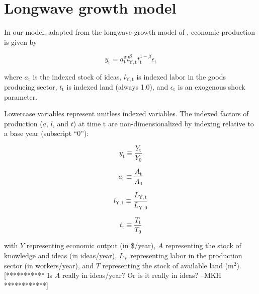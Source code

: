 \documentclass[letterpaper,12pt]{article}
\begin{document}

\section{Longwave growth model}
In our model, adapted from the longwave growth model of \citet{Jones:2001wn}, economic production is given by

\begin{equation} \label{eq:Jones_production_function}
	y_\mathrm{t} = a_\mathrm{t} ^\sigma l_\mathrm{Y,t} ^\beta t_\mathrm{t} ^{1-\beta} \epsilon_\mathrm{t}
\end{equation}

\noindent where $a_\mathrm{t}$ is the indexed stock of ideas, $l_\mathrm{Y,t}$ is indexed labor in the goods producing sector, $t_\mathrm{t}$ is indexed land (always 1.0), and $\epsilon_\mathrm{t}$ is an exogenous shock parameter. 

Lowercase variables represent unitless indexed variables. The indexed factors of production ($a$, $l$, and $t$) at time $\mathrm{t}$ are non-dimensionalized by indexing relative to a base year (subscript ``0''):

\begin{equation} \label{eq:index_y}
	y_\mathrm{t} \equiv \frac{Y_\mathrm{t}}{Y_\mathrm{0}}
\end{equation}

\begin{equation} \label{eq:index_a}
	a_\mathrm{t} \equiv \frac{A_\mathrm{t}}{A_\mathrm{0}}
\end{equation}

\begin{equation} \label{eq:index_l}
	l_\mathrm{Y,t} \equiv \frac{L_\mathrm{Y,t}}{L_\mathrm{Y,0}}
\end{equation}

\begin{equation} \label{eq:index_t}
	t_\mathrm{t} \equiv \frac{T_\mathrm{t}}{T_\mathrm{0}}
\end{equation}

\noindent with $Y$ representing economic output (in \$/year), $A$ representing the stock of knowledge and ideas (in ideas/year), $L_\mathrm{Y}$ representing labor in the production sector (in workers/year), and $T$ representing the stock of available land ($\mathrm{m}^2$). [*********** Is $A$ really in ideas/year? Or is it really in ideas? --MKH ************]
\end{document}
